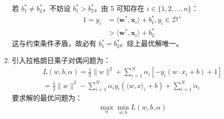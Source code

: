 \documentclass[11pt,letter,notitlepage]{article}
\begin{document}
\begin{solution}
\begin{enumerate}
		若 $b_1^* \neq b_2^*$，不妨设 $b_1^* > b_2^*$，由 5 可知存在 $i \in \{1, 2,\dots, n\}$：
		\begin{align*}
			1=y_i &= \langle \textbf{w}^*, \textbf{x}_i \rangle + b_1^*, y_i \in \mathcal{D}^+\\
			&> \langle \textbf{w}^*, \textbf{x}_i \rangle + b_2^*
		\end{align*}
		这与约束条件矛盾，故必有 $b_1^* = b_2^*$。综上最优解唯一。
		\item 引入拉格朗日乘子对偶问题为：
		\begin{align*}
			{ L ( w , b , \alpha ) = \frac { 1 } { 2 } \| w \| ^ { 2 } + \sum _ { i = 1 } ^ { N } \alpha _ { i } \left[ - y _ { i } \left( w \cdot x _ { i } + b \right) + 1 \right] } \\ { = \frac { 1 } { 2 } \| w \| ^ { 2 } - \sum _ { i = 1 } ^ { N } \alpha _ { i } y _ { i } \left(\langle w, x\rangle _ { i } + b \right) + \sum _ { i = 1 } ^ { N } \alpha _ { i } }
		\end{align*}
		要求解的最优问题为：
		\begin{align*}
			\max_{\alpha} \min_{w, b} L ( w , b , \alpha )
		\end{align*}

		
	\end{enumerate}
\end{solution}
\end{document}
